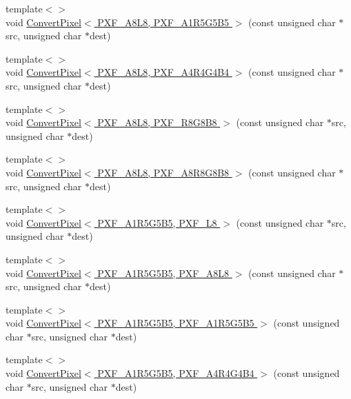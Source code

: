 \begin{DoxyCompactItemize}
{\footnotesize template$<$$>$ }\\void \hyperlink{_convert_pixel_8inl_a286a89ffa2651826bc96df677e00d594}{Convert\+Pixel$<$ P\+X\+F\+\_\+\+A8\+L8, P\+X\+F\+\_\+\+A1\+R5\+G5\+B5 $>$} (const unsigned char $\ast$src, unsigned char $\ast$dest)
\item 
{\footnotesize template$<$$>$ }\\void \hyperlink{_convert_pixel_8inl_a797a1090a568689a0bfc8b93addd4791}{Convert\+Pixel$<$ P\+X\+F\+\_\+\+A8\+L8, P\+X\+F\+\_\+\+A4\+R4\+G4\+B4 $>$} (const unsigned char $\ast$src, unsigned char $\ast$dest)
\item 
{\footnotesize template$<$$>$ }\\void \hyperlink{_convert_pixel_8inl_ad9a9251a5d6eb1ab66d536f68e14fe69}{Convert\+Pixel$<$ P\+X\+F\+\_\+\+A8\+L8, P\+X\+F\+\_\+\+R8\+G8\+B8 $>$} (const unsigned char $\ast$src, unsigned char $\ast$dest)
\item 
{\footnotesize template$<$$>$ }\\void \hyperlink{_convert_pixel_8inl_aae02b1bc2ec34922e695eb2b0ec97459}{Convert\+Pixel$<$ P\+X\+F\+\_\+\+A8\+L8, P\+X\+F\+\_\+\+A8\+R8\+G8\+B8 $>$} (const unsigned char $\ast$src, unsigned char $\ast$dest)
\item 
{\footnotesize template$<$$>$ }\\void \hyperlink{_convert_pixel_8inl_a59aea03431463c8350071e16af1449fa}{Convert\+Pixel$<$ P\+X\+F\+\_\+\+A1\+R5\+G5\+B5, P\+X\+F\+\_\+\+L8 $>$} (const unsigned char $\ast$src, unsigned char $\ast$dest)
\item 
{\footnotesize template$<$$>$ }\\void \hyperlink{_convert_pixel_8inl_ad258926ce9d6e2689f2899b2b2dc66db}{Convert\+Pixel$<$ P\+X\+F\+\_\+\+A1\+R5\+G5\+B5, P\+X\+F\+\_\+\+A8\+L8 $>$} (const unsigned char $\ast$src, unsigned char $\ast$dest)
\item 
{\footnotesize template$<$$>$ }\\void \hyperlink{_convert_pixel_8inl_a59936e71230ee86a43d738e59b520277}{Convert\+Pixel$<$ P\+X\+F\+\_\+\+A1\+R5\+G5\+B5, P\+X\+F\+\_\+\+A1\+R5\+G5\+B5 $>$} (const unsigned char $\ast$src, unsigned char $\ast$dest)
\item 
{\footnotesize template$<$$>$ }\\void \hyperlink{_convert_pixel_8inl_abd2bd032fb975d5e3a51cd13612aa8e6}{Convert\+Pixel$<$ P\+X\+F\+\_\+\+A1\+R5\+G5\+B5, P\+X\+F\+\_\+\+A4\+R4\+G4\+B4 $>$} (const unsigned char $\ast$src, unsigned char $\ast$dest)
\item 

\end{DoxyCompactItemize}
